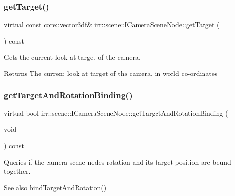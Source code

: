 \subsubsection{\texorpdfstring{get\+Target()}{getTarget()}\hspace{0.1cm}{\footnotesize\ttfamily [2/2]}}
{\footnotesize\ttfamily virtual const \hyperlink{namespaceirr_1_1core_ae6e2b2a6c552833ebbd5b7463d03586b}{core\+::vector3df}\& irr\+::scene\+::\+I\+Camera\+Scene\+Node\+::get\+Target (\begin{DoxyParamCaption}{ }\end{DoxyParamCaption}) const\hspace{0.3cm}{\ttfamily [pure virtual]}}



Gets the current look at target of the camera. 

\begin{DoxyReturn}{Returns}
The current look at target of the camera, in world co-\/ordinates 
\end{DoxyReturn}
\mbox{\label{classirr_1_1scene_1_1ICameraSceneNode_a343be24b2c43db7580127229db2dec6a}} 
\subsubsection{\texorpdfstring{get\+Target\+And\+Rotation\+Binding()}{getTargetAndRotationBinding()}\hspace{0.1cm}{\footnotesize\ttfamily [1/2]}}
{\footnotesize\ttfamily virtual bool irr\+::scene\+::\+I\+Camera\+Scene\+Node\+::get\+Target\+And\+Rotation\+Binding (\begin{DoxyParamCaption}\item[{void}]{ }\end{DoxyParamCaption}) const\hspace{0.3cm}{\ttfamily [pure virtual]}}



Queries if the camera scene node\textquotesingle{}s rotation and its target position are bound together. 

\begin{DoxySeeAlso}{See also}
\hyperlink{classirr_1_1scene_1_1ICameraSceneNode_ad8785d7b2f730933a8d4425ac54e7205}{bind\+Target\+And\+Rotation()} 
\end{DoxySeeAlso}
\mbox{\label{classirr_1_1scene_1_1ICameraSceneNode_a343be24b2c43db7580127229db2dec6a}} 
